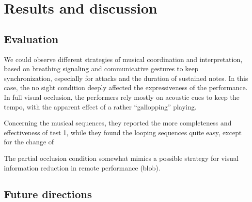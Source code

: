 \section{Results and discussion}\label{sec:discussion}

\subsection{Evaluation}
We could observe different strategies of musical coordination and interpretation, based on breathing signaling and communicative gestures to keep synchronization, especially for attacks and the duration of sustained notes. In this case, the no sight condition deeply affected the expressiveness of the performance. In full visual occlusion, the performers rely mostly on acoustic cues to keep the tempo, with the apparent effect of a rather “gallopping” playing.

Concerning the musical sequences, they reported the more completeness and effectiveness of test 1, while they found the looping sequences quite easy, except for the change of 


The partial occlusion condition somewhat mimics a possible strategy for visual information reduction in remote performance (blob). 


\subsection{Future directions}


